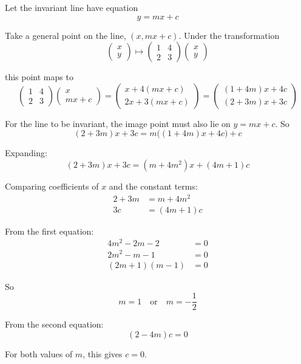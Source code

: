 \documentclass[leqno]{article}
\begin{document}
\begin{enumerate}[
  label=\textbf{\arabic*.},
  leftmargin=*,
  topsep=0pt,
  partopsep=0pt,
  parsep=0pt
]
\vspace*{10pt}

\begin{djsSolution}
Let the invariant line have equation
\[
y=mx+c
\]

Take a general point on the line, \((x,mx+c)\). Under the transformation
\[
\begin{pmatrix}x\\y\end{pmatrix}
\mapsto
\begin{pmatrix}
1 & 4\\
2 & 3
\end{pmatrix}
\begin{pmatrix}x\\y\end{pmatrix}
\]

this point maps to
\[
\begin{pmatrix}
1 & 4\\
2 & 3
\end{pmatrix}
\begin{pmatrix}
x\\
mx+c
\end{pmatrix}
=
\begin{pmatrix}
x+4(mx+c)\\
2x+3(mx+c)
\end{pmatrix}
=
\begin{pmatrix}
(1+4m)x+4c\\
(2+3m)x+3c
\end{pmatrix}
\]

For the line to be invariant, the image point must also lie on \(y=mx+c\). So
\[
(2+3m)x+3c = m\bigl((1+4m)x+4c\bigr)+c
\]

Expanding:
\[
(2+3m)x+3c=(m+4m^2)x+(4m+1)c
\]

Comparing coefficients of \(x\) and the constant terms:
\begin{align*}
2+3m&=m+4m^2\\
3c&=(4m+1)c
\end{align*}

From the first equation:
\begin{align*}
4m^2-2m-2&=0\\
2m^2-m-1&=0\\
(2m+1)(m-1)&=0
\end{align*}

So
\[
m=1 \quad \text{or} \quad m=-\frac12
\]

From the second equation:
\[
(2-4m)c=0
\]

For both values of \(m\), this gives \(c=0\).


\end{djsSolution}
\end{enumerate}
\end{document}
